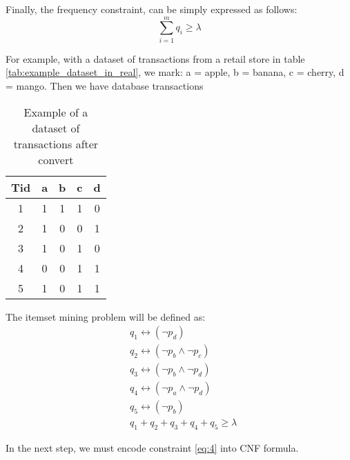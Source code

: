 Finally, the frequency constraint, can be simply expressed as follows:
\begin{equation}
    \label{eq:4}
    \sum_{i=1}^{m} q_i \geq \lambda
\end{equation}

For example, with a dataset of transactions from a retail store in table \ref{tab:example_dataset_in_real}, we mark:
a = apple, b = banana, c = cherry, d = mango. Then we have database transactions

\begin{table}[H]
    \centering
    \begin{tabular}{|c| c c c c |}
        \hline
        \textbf{Tid} & \textbf{a} & \textbf{b} & \textbf{c} & \textbf{d} \\
        \hline
        1            & 1          & 1          & 1          & 0          \\
        2            & 1          & 0          & 0          & 1          \\
        3            & 1          & 0          & 1          & 0          \\
        4            & 0          & 0          & 1          & 1          \\
        5            & 1          & 0          & 1          & 1          \\
        \hline
    \end{tabular}
    \caption{Example of a dataset of transactions after convert}
    \label{tab:example_dataset_after_convert}
\end{table}

The itemset mining problem will be defined as:
\begin{equation*}
    \begin{aligned}
         & q_1 \leftrightarrow (\neg p_d                ) \\
         & q_2 \leftrightarrow (\neg p_b \wedge \neg p_c) \\
         & q_3 \leftrightarrow (\neg p_b \wedge \neg p_d) \\
         & q_4 \leftrightarrow (\neg p_a \wedge \neg p_d) \\
         & q_5 \leftrightarrow (\neg p_b                ) \\
         & q_1 + q_2 + q_3 + q_4 + q_5 \geq \lambda
    \end{aligned}
\end{equation*}

In the next step, we must encode constraint \ref{eq:4} into CNF formula.
